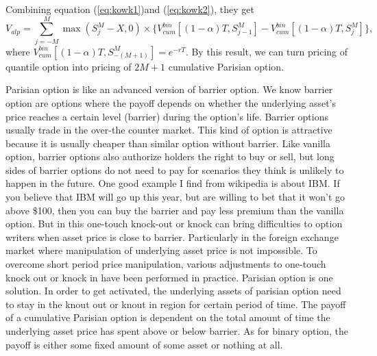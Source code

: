 \documentclass[11pt]{book}
\begin{document}
Combining equation (\ref{eq:kowk1})and (\ref{eq:kowk2}), they get
\begin{equation}\label{eq:kowk3}
V_{alp} = \sum^M_{j=-M} \max (S^M_j - X,0) \times \{V_{cum}^{bin}[(1-\alpha)T, S^M_{j-1}] - V^{bin}_{cum}[(1-\alpha)T, S^M_j]\} ,
\end{equation}
where $V^{bin}_{cum}[(1-\alpha)T, S_{-(M+1)}^M] = e^{-rT}$. By this result, we can turn pricing of quantile option into pricing of $2M+1$ cumulative Parisian option.


Parisian option is like an advanced version of barrier option. We know barrier option are options where the payoff depends on whether the underlying asset's price reaches a certain level (barrier) during the option's life. Barrier options usually trade in the over-the counter market. This kind of option is attractive because it is usually cheaper than similar option without barrier. Like vanilla option, barrier options also authorize holders the right to buy or sell, but  long sides of barrier options do not need to pay for scenarios they think is unlikely to happen in the future. One good example I find from wikipedia is about IBM. If you believe that IBM will go up this year, but are willing to bet that it won't go above \$100, then you can buy the barrier and pay less premium than the vanilla option. But in this one-touch knock-out or knock can bring difficulties to option writers when asset price is close to barrier. Particularly in the foreign exchange market where manipulation of underlying asset price is not impossible. To overcome short period price manipulation, various adjustments to one-touch knock out or knock in have been performed in practice. Parisian option is one solution.  In order to get activated, the underlying assets of parisian option need to stay in the knout out or knout in region for certain period of time. The payoff of a cumulative Parisian option is dependent on the total amount of time the underlying asset price has spent above or below barrier. As for binary option, the payoff is either some fixed amount of some asset or nothing at all.
\end{document}
